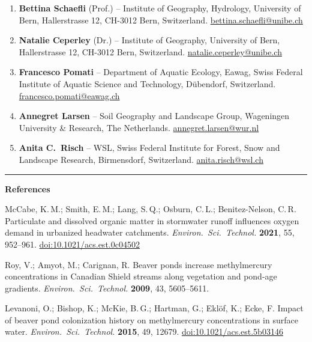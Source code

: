 \documentclass[11pt,a4paper]{article}
\begin{document}
\begin{enumerate}[leftmargin=*,itemsep=0.3em]
\item \textbf{Bettina Schaefli} (Prof.) -- Institute of Geography, Hydrology, University of Bern, Hallerstrasse 12, CH-3012 Bern, Switzerland. \href{mailto:bettina.schaefli@unibe.ch}{bettina.schaefli@unibe.ch}
\item \textbf{Natalie Ceperley} (Dr.) -- Institute of Geography, University of Bern, Hallerstrasse 12, CH-3012 Bern, Switzerland. \href{mailto:natalie.ceperley@unibe.ch}{natalie.ceperley@unibe.ch}
\item \textbf{Francesco Pomati} -- Department of Aquatic Ecology, Eawag, Swiss Federal Institute of Aquatic Science and Technology, D\"ubendorf, Switzerland. \href{mailto:francesco.pomati@eawag.ch}{francesco.pomati@eawag.ch}
\item \textbf{Annegret Larsen} -- Soil Geography and Landscape Group, Wageningen University \& Research, The Netherlands. \href{mailto:annegret.larsen@wur.nl}{annegret.larsen@wur.nl}
\item \textbf{Anita C.\ Risch} -- WSL, Swiss Federal Institute for Forest, Snow and Landscape Research, Birmensdorf, Switzerland. \href{mailto:anita.risch@wsl.ch}{anita.risch@wsl.ch}
\end{enumerate}

\bigskip\hrule\bigskip

\textbf{References}

\begin{enumerate}[leftmargin=*,itemsep=0.3em,label={[\arabic*]}]
\item McCabe, K.\,M.; Smith, E.\,M.; Lang, S.\,Q.; Osburn, C.\,L.; Benitez-Nelson, C.\,R. Particulate and dissolved organic matter in stormwater runoff influences oxygen demand in urbanized headwater catchments. \emph{Environ.\ Sci.\ Technol.} \textbf{2021}, 55, 952--961. \href{https://doi.org/10.1021/acs.est.0c04502}{doi:10.1021/acs.est.0c04502}
\item Roy, V.; Amyot, M.; Carignan, R. Beaver ponds increase methylmercury concentrations in Canadian Shield streams along vegetation and pond-age gradients. \emph{Environ.\ Sci.\ Technol.} \textbf{2009}, 43, 5605--5611.
\item Levanoni, O.; Bishop, K.; McKie, B.\,G.; Hartman, G.; Eklöf, K.; Ecke, F. Impact of beaver pond colonization history on methylmercury concentrations in surface water. \emph{Environ.\ Sci.\ Technol.} \textbf{2015}, 49, 12679. \href{https://doi.org/10.1021/acs.est.5b03146}{doi:10.1021/acs.est.5b03146}
\end{enumerate}
\end{document}
